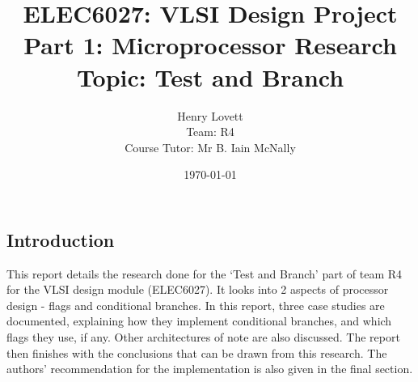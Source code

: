 \documentclass[12pt,a4paper]{article}
\title{ELEC6027: VLSI Design Project \\Part 1: Microprocessor Research\\Topic: Test and Branch}
\author{Henry Lovett\\ Team: R4\\Course Tutor: Mr B. Iain McNally}
\date{\today}
\begin{document}
\begin{titlepage}
\maketitle
\thispagestyle{empty}
\end{titlepage}

\tableofcontents
\clearpage
\begin{bibunit}[is-unsrt]
\section{Introduction}

This report details the research done for the `Test and Branch' part of team R4 for the VLSI design module (ELEC6027).
It looks into 2 aspects of processor design - flags and conditional branches. 
In this report, three case studies are documented, explaining how they implement conditional branches, and which flags they use, if any.
Other architectures of note are also discussed.
The report then finishes with the conclusions that can be drawn from this research.
The authors' recommendation for the implementation is also given in the final section.


%


\end{bibunit}
\end{document}
